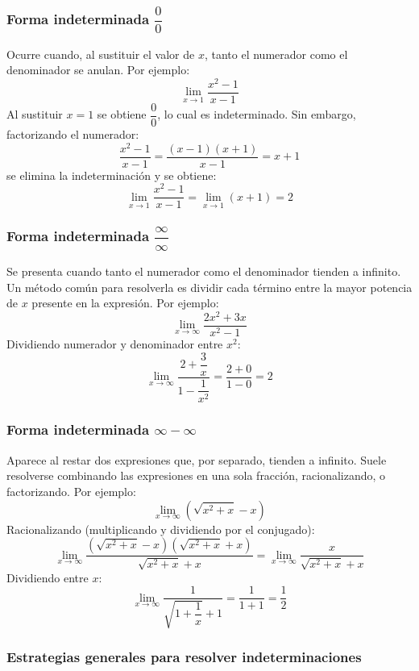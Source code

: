 \documentclass[12pt]{article}
\begin{document}
\subsubsection{Forma indeterminada $\dfrac{0}{0}$}


Ocurre cuando, al sustituir el valor de $x$, tanto el numerador como el denominador se anulan. Por ejemplo:
\[
\lim_{x \to 1} \frac{x^2 - 1}{x - 1}
\]
Al sustituir $x = 1$ se obtiene $\dfrac{0}{0}$, lo cual es indeterminado. Sin embargo, factorizando el numerador:
\[
\frac{x^2 - 1}{x - 1} = \frac{(x-1)(x+1)}{x-1} = x + 1
\]
se elimina la indeterminación y se obtiene:
\[
\lim_{x \to 1} \frac{x^2 - 1}{x - 1} = \lim_{x \to 1} (x + 1) = 2
\]



\subsubsection{Forma indeterminada $\dfrac{\infty}{\infty}$}


Se presenta cuando tanto el numerador como el denominador tienden a infinito. Un método común para resolverla es dividir cada término entre la mayor potencia de $x$ presente en la expresión. Por ejemplo:
\[
\lim_{x \to \infty} \frac{2x^2 + 3x}{x^2 - 1}
\]
Dividiendo numerador y denominador entre $x^2$:
\[
\lim_{x \to \infty} \frac{2 + \dfrac{3}{x}}{1 - \dfrac{1}{x^2}} = \frac{2 + 0}{1 - 0} = 2
\]



\subsubsection{Forma indeterminada $\infty - \infty$}


Aparece al restar dos expresiones que, por separado, tienden a infinito. Suele resolverse combinando las expresiones en una sola fracción, racionalizando, o factorizando. Por ejemplo:
\[
\lim_{x \to \infty} \left( \sqrt{x^2 + x} - x \right)
\]
Racionalizando (multiplicando y dividiendo por el conjugado):
\[
\lim_{x \to \infty} \frac{(\sqrt{x^2+x} - x)(\sqrt{x^2+x}+x)}{\sqrt{x^2+x}+x} = \lim_{x \to \infty} \frac{x}{\sqrt{x^2+x}+x}
\]
Dividiendo entre $x$:
\[
\lim_{x \to \infty} \frac{1}{\sqrt{1 + \dfrac{1}{x}} + 1} = \frac{1}{1+1} = \frac{1}{2}
\]



\subsubsection{Estrategias generales para resolver indeterminaciones}
\end{document}
